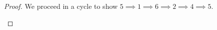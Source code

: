 \documentclass[12pt]{article}
\newcommand{\Comments}{1}
\newcommand{\mynote}[2]{\ifnum\Comments=1\textcolor{#1}{#2}\fi}
\newcommand{\jessie}[1]{\mynote{purple}{[JF: #1]}}
\renewcommand{\P}{\mathcal{P}}
\newcommand{\R}{\mathcal{R}}
\newcommand{\inter}[1]{\mathring{#1}}%
\newcommand{\trim}{\mathrm{trim}}
\newcommand{\strip}{\mathrm{strip}}
\begin{document}
\begin{proof}
We proceed in a cycle to show $5 \implies 1 \implies 6 \implies 2 \implies 4 \implies 5$.

\begin{enumerate}
	
	

\end{enumerate}
\end{proof}
\end{document}
